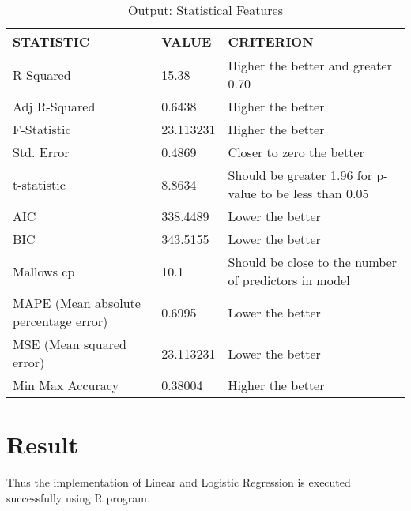 \documentclass[a4paper,10pt]{article}
\begin{document}
\begin{table}
      \caption{Output: Statistical Features}
      
   	  \begin{tabular}{|l|l|l|} %
      \hline
      \textbf{STATISTIC} & \textbf{VALUE} & \textbf{CRITERION}\\ \hline
       R-Squared & 15.38 & Higher the better and greater  0.70\\ \hline
       Adj R-Squared & 0.6438 & Higher the better \\ \hline
       F-Statistic & 23.113231 & Higher the better \\ \hline
       Std. Error & 0.4869 & Closer to zero the better \\ \hline
       t-statistic & 8.8634 & Should be greater 1.96 for p-value to be less than 0.05 \\ \hline
       AIC & 338.4489 & Lower the better \\ \hline
       BIC & 343.5155 & Lower the better \\ \hline
       Mallows cp & 10.1 & Should be close to the number of predictors in model \\ \hline
       MAPE (Mean absolute percentage error) & 0.6995 & Lower the better \\ \hline
       MSE (Mean squared error) & 23.113231 & Lower the better \\ \hline
       Min Max Accuracy & 0.38004 & Higher the better \\ \hline
        \end{tabular}
\end{table}
 \vfill
\section{Result}
Thus the implementation of Linear and Logistic Regression is executed successfully using R program.
\end{document}
